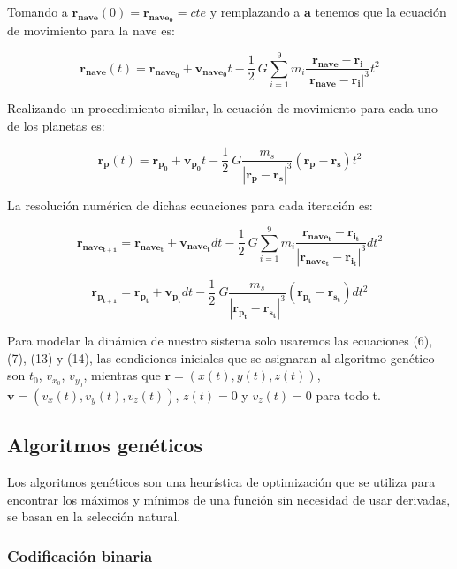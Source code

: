 \documentclass[12pt,letterpaper]{article}
\begin{document}
Tomando a $\mathbf{r_{nave}}(0)=\mathbf{r_{nave_0}}=cte$ y remplazando a $\mathbf{a}$ tenemos que la ecuación de movimiento para la nave es:

\begin{equation}
\mathbf{r_{nave}}(t) = \mathbf{r_{nave_0}} + \mathbf{v_{nave_0}}t - \dfrac{1}{2}\ G \sum_{i=1}^{9} m_ i\dfrac{\mathbf{r_{nave}}-\mathbf{r_i}}{|\mathbf{r_{nave}}-\mathbf{r_i}|^3} t^2
\end{equation}

Realizando un procedimiento similar, la ecuación de movimiento para cada uno de los planetas es:

\begin{equation}
\mathbf{r_{p}}(t) = \mathbf{r_{p_0}} + \mathbf{v_{p_0}}t - \dfrac{1}{2}\ G\dfrac{m_s}{|\mathbf{r_{p}}-\mathbf{r_s}|^3}(\mathbf{r_{p}}-\mathbf{r_s}) t^2
\end{equation}

La resolución numérica de dichas ecuaciones para cada iteración es:

\begin{equation}
\mathbf{r_{nave_{t+1}}} = \mathbf{r_{nave_t}} + \mathbf{v_{nave_t}}dt - \dfrac{1}{2}\ G \sum_{i=1}^{9} m_ {i}\dfrac{\mathbf{r_{nave_t}}-\mathbf{r_{i_t}}}{|\mathbf{r_{nave_t}}-\mathbf{r_{i_t}}|^3} dt^2
\end{equation}

\begin{equation}
\mathbf{r_{p_{t+1}}} = \mathbf{r_{p_t}} + \mathbf{v_{p_t}}dt - \dfrac{1}{2}\ G\dfrac{m_s}{|\mathbf{r_{p_t}}-\mathbf{r_{s_t}}|^3}(\mathbf{r_{p_t}}-\mathbf{r_{s_t}}) dt^2
\end{equation}

Para modelar la dinámica de nuestro sistema solo usaremos las ecuaciones (6), (7), (13) y (14), las condiciones iniciales que se asignaran al algoritmo genético son $t_0$, $v_{x_0}$, $v_{y_0}$, mientras que $\mathbf{r}=(x(t),y(t),z(t))$, $\mathbf{v}=(v_x(t),v_y(t),v_z(t))$, $z(t)=0$ y $v_z(t)=0$ para todo t.

\subsection*{Algoritmos genéticos}

Los algoritmos genéticos son una heurística de optimización que se utiliza para encontrar los máximos y mínimos de una función sin necesidad de usar derivadas, se basan en la selección natural.

\subsubsection*{Codificación binaria}
\end{document}
